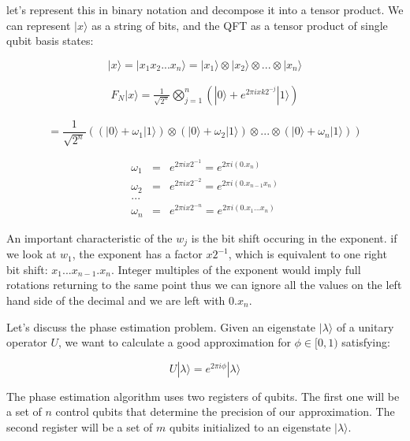 \documentclass[twocolumn,showpacs,preprintnumbers,amsmath,amssymb]{revtex4}
\begin{document}
		let's represent this in binary notation and decompose it into a tensor product. We can represent $|x\rangle$ as a string of bits, and the QFT as a tensor product of single qubit basis states:
				
		$$|x\rangle = |x_1x_2 ... x_n\rangle =  |x_1\rangle \otimes |x_2\rangle \otimes ... \otimes |x_n\rangle$$
		
		\begin{eqnarray}
		F_N |x \rangle = \frac{1}{\sqrt{2^n}} \bigotimes_{j=1}^n (|0\rangle +  e^{2\pi i x k 2^{-j}} |1\rangle)
		\end{eqnarray}
		
		$$= \frac{1}{\sqrt{2^n}} ((|0\rangle + \omega_1|1\rangle)  \otimes(|0\rangle + \omega_2|1\rangle)\otimes ... \otimes(|0\rangle + \omega_n|1\rangle))$$
	    
	     
		\begin{eqnarray*}
		\omega_1 &=& e^{2\pi i x 2^{-1}} =  e^{2\pi i (0.x_n)}\\
		\omega_2 &=& e^{2\pi i x 2^{-2}} =  e^{2\pi i (0.x_{n-1}x_n)}\\
		...\\
		\omega_n &=& e^{2\pi i x 2^{-n}} =  e^{2\pi i (0.x_1...x_n)}
		\end{eqnarray*}
	    
		
		An important characteristic of the $w_j$ is the bit shift occuring in the exponent. if we look at $w_1$, the exponent has a factor $x 2^{-1}$, which is equivalent to one right bit shift: $x_1...x_{n-1}.x_n$. Integer multiples of the exponent would imply full rotations returning to the same point thus we can ignore all the values on the left hand side of the decimal and we are left with $0.x_n$. 
		
		
	    
		Let's discuss the phase estimation problem. Given an eigenstate $|\lambda \rangle$ of a unitary operator $U$, we want to calculate a good approximation  for $\phi \in [0,1)$ satisfying:
		
		\begin{equation}
		 U |\lambda \rangle = e^{2\pi i \phi} |\lambda \rangle
	    \end{equation}
	    
	    The phase estimation algorithm uses two registers of qubits. The first one will be a set of $n$ control qubits that determine the precision of our approximation. The second register will be a set of $m$ qubits initialized to an eigenstate $|\lambda\rangle$.
	    
\end{document}
